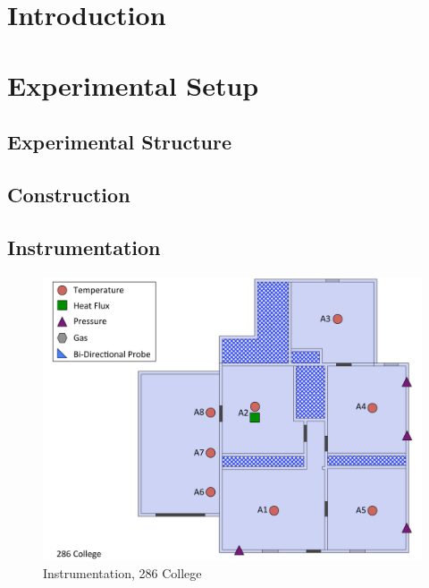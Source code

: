 \documentclass[12pt,oneside]{book}
\begin{document}
\mainmatter

\chapter{Introduction}
\label{chap:Introduction}

\chapter{Experimental Setup}
\label{chap:Experimental_Setup}

\section{Experimental Structure}
\label{sec:Experimental_Structure}

\section{Construction}
\label{sec:Construction}

\section{Instrumentation}
\label{sec:Instrumentation}

\begin{figure}[!ht]
\includegraphics[width=6in]{../Figures/Instrumentation/286_College}
\caption{Instrumentation, 286 College}
\label{fig:Instrumentation_286_College}
\end{figure}
\end{document}
